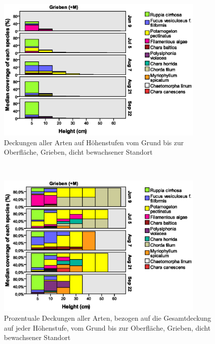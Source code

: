 \begin{figure}[!htb]
\centering
\includegraphics[width=0.90\textwidth]{images/Wuchshoehenkartierung/Grieben+M1.eps}
\caption[Höhenstufenkartierung Grieben (+M)]{Deckungen aller Arten auf Höhenstufen vom Grund bis zur Oberfläche, Grieben, dicht bewachsener Standort}
\label{fig:wuchshoehen_grieben_+m1}
\end{figure}
\\
\begin{figure}[!htb]
\centering
\includegraphics[width=0.90\textwidth]{images/Wuchshoehenkartierung/Grieben+M2.eps}
\caption[prozentuale Höhenstufenkartierung Grieben (+M)]{Prozentuale Deckungen aller Arten, bezogen auf die Gesamtdeckung auf jeder Höhenstufe, vom Grund bis zur Oberfläche, Grieben, dicht bewachsener Standort}
\label{fig:wuchshoehen_grieben_+m2}
\end{figure}

\FloatBarrier

